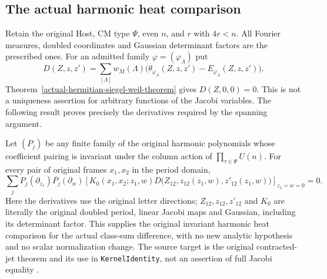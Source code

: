 \subsection{The actual harmonic heat comparison}
\label{actual-theta-heat-comparison}

Retain the original Host, CM type $\Psi$, even $n$, and $r$ with
$4r<n$. All Fourier measures, doubled coordinates and Gaussian
determinant factors are the prescribed ones. For an admitted family
$\varphi=(\varphi_\Lambda)$ put
\[
 D(Z,z,z')=\sum_{[\Lambda]}w_M(\Lambda)
       \bigl(\theta_{\varphi_\Lambda}(Z,z,z')
                         -E_{\varphi_\Lambda}(Z,z,z')\bigr).
\]
Theorem~\ref{actual-hermitian-siegel-weil-theorem} gives
$D(Z,0,0)=0$. This is not a uniqueness assertion for arbitrary
functions of the Jacobi variables. The following result proves
precisely the derivatives required by the spanning argument.

\begin{theorem}\label{actual-theta-heat-theorem}
Let $(P_j)$ be any finite family of the original harmonic polynomials
whose coefficient pairing is invariant under the column action of
$\prod_{\tau\in\Psi}U(n)$. For every pair of original frames
$x_1,x_2$ in the period domain,
\begin{equation}\label{actual-theta-heat-vanishing}
 \sum_j P_j(\partial_{z_1})\overline{P_j}(\partial_w)
 \left[
 K_0(x_1,x_2;z_1,w)
 D\bigl(Z_{12},z_{12}(z_1,w),z'_{12}(z_1,w)\bigr)
 \right]_{z_1=w=0}=0.
\end{equation}
Here the derivatives use the original letter directions;
$Z_{12},z_{12},z'_{12}$ and $K_0$ are literally the original doubled
period, linear Jacobi maps and Gaussian, including its determinant
factor. This supplies the original invariant harmonic heat comparison
for the actual class-sum difference, with no new analytic hypothesis
and no scalar normalization change.
The source target is the original contracted-jet theorem and its use in
\texttt{KernelIdentity}, not an assertion of full Jacobi equality
\cite{actual-sw-source}.
\end{theorem}

